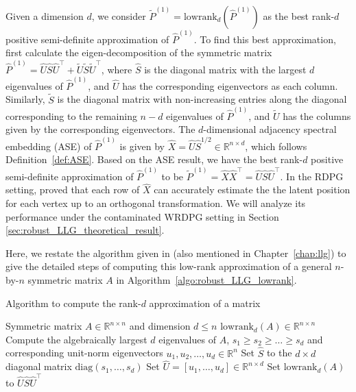 Given a dimension $d$, we consider $\widetilde{P}^{(1)} = \mathrm{lowrank}_d(\hat{P}^{(1)})$ as the best rank-$d$ positive semi-definite approximation of $\hat{P}^{(1)}$. To find this best approximation, first calculate the eigen-decomposition of the symmetric matrix $\hat{P}^{(1)} = \hat{U} \hat{S} \hat{U}^{\top} + \widetilde{U} \widetilde{S} \widetilde{U}^{\top}$, where $\hat{S}$ is the diagonal matrix with the largest $d$ eigenvalues of $\hat{P}^{(1)}$, and $\hat{U}$ has the corresponding eigenvectors as each column. Similarly, $\tilde{S}$ is the diagonal matrix with non-increasing entries along the diagonal corresponding to the remaining $n - d$ eigenvalues of $\hat{P}^{(1)}$, and $\tilde{U}$ has the columns given by the corresponding eigenvectors.
The $d$-dimensional adjacency spectral embedding (ASE) of $\hat{P}^{(1)}$ is given by $\hat{X}=\hat{U} \hat{S}^{1/2}\in \mathbb{R}^{n \times d}$, which follows Definition~\ref{def:ASE}.
Based on the ASE result, we have the best rank-$d$ positive semi-definite approximation of $\hat{P}^{(1)}$ to be $\widetilde{P}^{(1)} = \hat{X} \hat{X}^{\top}=\hat{U}\hat{S}\hat{U}^{\top}$.
In the RDPG setting, \citet{sussman2014consistent} proved that each row of $\hat{X}$ can accurately estimate the the latent position for each vertex up to an orthogonal transformation. We will analyze its performance under the contaminated WRDPG setting in Section \ref{sec:robust_LLG_theoretical_result}.

Here, we restate the algorithm given in \citep{tang2016law} (also mentioned in Chapter~\ref{chap:llg}) to give the detailed steps of computing this low-rank approximation of a general $n$-by-$n$ symmetric matrix $A$ in Algorithm~\ref{algo:robust_LLG_lowrank}.
\begin{algorithm}[H]
\caption{Algorithm to compute the rank-$d$ approximation of a matrix}
\label{algo:robust_LLG_lowrank}
\begin{algorithmic}[1]
\REQUIRE Symmetric matrix $A\in \mathbb{R}^{n \times n}$ and dimension $d\leq n$
\ENSURE $\mathrm{lowrank}_d(A)\in \mathbb{R}^{n \times n}$
\STATE Compute the algebraically largest $d$ eigenvalues of $A$, $s_1\geq s_2\ge \dotsc \ge s_d$ and corresponding unit-norm eigenvectors $u_1,u_2,\dotsc,u_d\in \mathbb{R}^n$
\STATE Set $\hat{S}$ to the $d\times d$ diagonal matrix $\mathrm{diag}(s_1,\dotsc,s_d)$
\STATE Set $\hat{U} = [u_1,\dotsc,u_d]\in \mathbb{R}^{n \times d}$
\STATE Set $\mathrm{lowrank}_d(A)$ to $\hat{U}\hat{S}\hat{U}^{\top}$
\end{algorithmic}
\end{algorithm}

